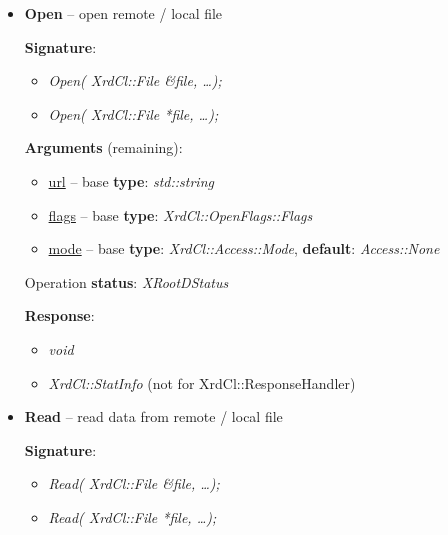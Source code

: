 \documentclass{article}
\begin{document}
			\begin{itemize}

                \item \begin{samepage} \textbf{Open} -- open remote / local file

                    \textbf{Signature}:
                    \begin{itemize}
                        \item \textit{Open( XrdCl::File \&file, \ldots);}
                        \item \textit{Open( XrdCl::File *file, \ldots );}
                    \end{itemize}

                    \textbf{Arguments} (remaining):
                    \begin{itemize}
                        \item \underline{url} -- base \textbf{type}: \textit{std::string}
                        \item \underline{flags} -- base \textbf{type}: \textit{XrdCl::OpenFlags::Flags}
                        \item \underline{mode} -- base \textbf{type}: \textit{XrdCl::Access::Mode}, \textbf{default}: \textit{Access::None}
                    \end{itemize}

                    Operation \textbf{status}: \textit{XRootDStatus}

                    \textbf{Response}:
                    \begin{itemize}
                        \item \textit{void}
                        \item \textit{XrdCl::StatInfo} \scriptsize{(not for XrdCl::ResponseHandler)}
                    \end{itemize}
					
                \end{samepage}

                \item \begin{samepage} \textbf{Read} -- read data from remote / local file

                    \textbf{Signature}:
                    \begin{itemize} 
                        \item \textit{Read( XrdCl::File \&file, \ldots);}
                        \item \textit{Read( XrdCl::File *file, \ldots );}
                    \end{itemize}


\end{samepage}
\end{itemize}
\end{document}
